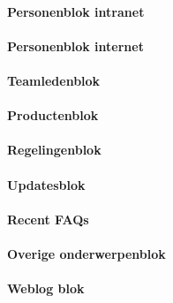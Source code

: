 \paragraph{Personenblok intranet}

\paragraph{Personenblok internet}\label{personenblokinternet}

\paragraph{Teamledenblok}

\paragraph{Productenblok}

\paragraph{Regelingenblok}

\paragraph{Updatesblok}

\paragraph{Recent FAQs}

\paragraph{Overige onderwerpenblok}

\paragraph{Weblog blok}
